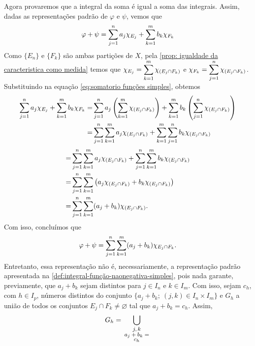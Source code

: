 \begin{prova}
    Agora provaremos que a integral da soma é igual a soma das integrais. 
    Assim, dadas as representações padrão de $\varphi$ e $\psi$, vemos que
    \begin{equation}
    	\label{eq:somatorio funções simples}
    	\varphi +\psi
    	=
    	\displaystyle \sum_{j = 1}^n a_j\chi_{E_j}
    	+
    	\displaystyle \sum_{k = 1}^m b_k\chi_{F_k}
    \end{equation}
    Como $\{E_n\}$ e $\{F_k\}$ são ambas partições de $X$, pela \ref{prop: igualdade da caracteristica como medida} temos que
    $\chi_{E_j} = \dsum_{k = 1}^m \chi_{(E_j \cap F_k)}$ e 
    $\chi_{F_k} = \dsum_{j = 1}^n \chi_{(E_j \cap F_k)}$.
    Substituindo na equação \ref{eq:somatorio funções simples}, obtemos    
    \begin{align*}
    	\displaystyle \sum_{j = 1}^n a_j\chi_{E_j}
    	+
    	\displaystyle \sum_{k = 1}^m b_k\chi_{F_k}
    	= &
    	\displaystyle \sum_{j = 1}^n a_j\left(\displaystyle \sum_{k = 1}^m \chi_{(E_j \cap F_k)}\right)
    	+
    	\displaystyle \sum_{k = 1}^m b_k\left(\displaystyle \sum_{j = 1}^n \chi_{(E_j \cap F_k)}\right)\\
    	= &
    	\displaystyle \sum_{j = 1}^n\displaystyle \sum_{k = 1}^m a_j\chi_{(E_j \cap F_k)}
    	+
    	\displaystyle \sum_{k = 1}^m \displaystyle \sum_{j = 1}^n b_k\chi_{(E_j \cap F_k)}\\
	\end{align*}
	\begin{align*}
		= &
		\displaystyle \sum_{j = 1}^n\displaystyle \sum_{k = 1}^m a_j\chi_{(E_j \cap F_k)}
		+
		\displaystyle \sum_{j = 1}^n \displaystyle \sum_{k = 1}^m  b_k\chi_{(E_j \cap F_k)}\\
		= &
		\displaystyle \sum_{j = 1}^n\displaystyle \sum_{k = 1}^m 
		\left(a_j\chi_{(E_j \cap F_k)}
		+
		b_k\chi_{(E_j \cap F_k)}\right)\\
		= &
		\displaystyle \sum_{j = 1}^n\displaystyle \sum_{k = 1}^m 
		(a_j + b_k)\chi_{(E_j \cap F_k)}.
	\end{align*}
    Com isso, concluímos que
    $$
    \varphi + \psi = \dsum_{j = 1}^n\dsum_{k = 1}^m(a_j + b_k)\chi_{E_j \cap F_k}.
    $$
    Entretanto, essa representação não é, necessariamente, a representação padrão apresentada na \ref{def:integral-função-naonegativa-simples}, pois 
    nada garante, previamente, que $a_j + b_k$ sejam distintos para $j \in I_n$ e $k \in I_m$.
    Com isso, sejam $c_h$, com $h \in I_p$, números distintos do conjunto $\{a_j + b_k; \ (j,k) \in I_n \times I_m\}$ e $G_h$ a união de todos os conjuntos $E_j \cap F_k \neq \varnothing$ tal que $a_j + b_k = c_h$.
    Assim, 
    $$
    G_h = \bigcup_{\begin{minipage}{1.4cm}
        \fontsize{8}{5}\selectfont
        \centering
        $j,k$
        $a_j + b_k = c_h$

\end{minipage}}$$
\end{prova}
